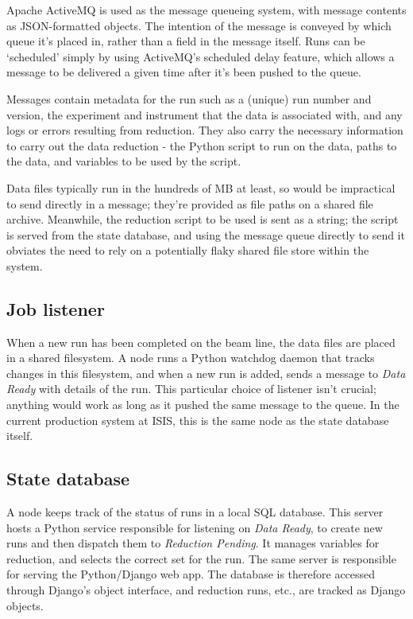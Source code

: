 \documentclass[twocolumn]{article}
\begin{document}
Apache ActiveMQ \cite{activemq} is used as the message queueing system, with
message contents as JSON-formatted objects. The intention of the message
is conveyed by which queue it's placed in, rather than a field in the
message itself. Runs can be `scheduled' simply by using ActiveMQ's
scheduled delay feature, which allows a message to be delivered a given
time after it's been pushed to the queue.

Messages contain metadata for the run such as a (unique) run number and
version, the experiment and instrument that the data is associated with,
and any logs or errors resulting from reduction. They also carry the
necessary information to carry out the data reduction - the Python
script to run on the data, paths to the data, and variables to be used
by the script.

Data files typically run in the hundreds of MB at least, so would be
impractical to send directly in a message; they're provided as file
paths on a shared file archive. Meanwhile, the reduction script to be
used is sent as a string; the script is served from the state database,
and using the message queue directly to send it obviates the need to
rely on a potentially flaky shared file store within the system.

\subsection{Job listener}\label{job-listener}

When a new run has been completed on the beam line, the data files are
placed in a shared filesystem. A node runs a Python watchdog daemon that
tracks changes in this filesystem, and when a new run is added, sends a
message to \emph{Data Ready} with details of the run. This particular
choice of listener isn't crucial; anything would work as long as it
pushed the same message to the queue. In the current production system
at ISIS, this is the same node as the state database itself.

\subsection{State database}\label{state-database}

A node keeps track of the status of runs in a local SQL database. This
server hosts a Python service responsible for listening on \emph{Data
Ready}, to create new runs and then dispatch them to \emph{Reduction
Pending}. It manages variables for reduction, and selects the correct
set for the run. The same server is responsible for serving the
Python/Django web app. The database is therefore accessed through
Django's object interface, and reduction runs, etc., are tracked as
Django objects.
\end{document}
